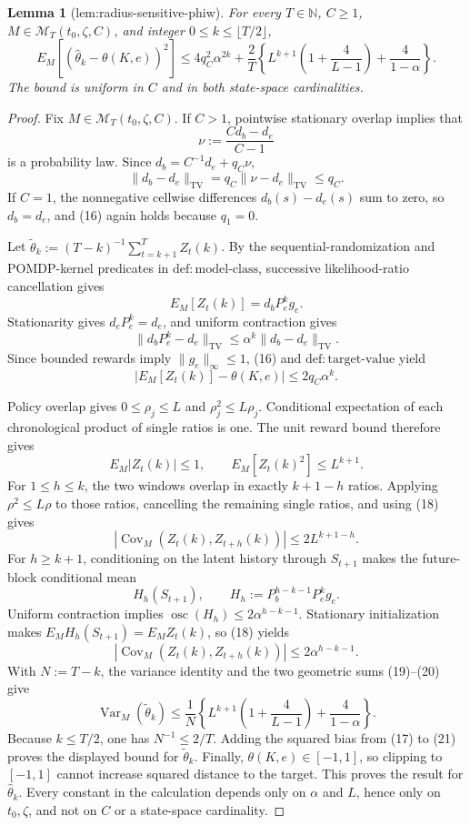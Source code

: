 \documentclass{article}
\newtheorem{lemma}{Lemma}
\begin{document}
\begin{lemma}[lem:radius-sensitive-phiw]\label{lem:radius-sensitive-phiw}
For every \(T\in\mathbb N\), \(C\ge1\), \(M\in\mathcal M_T(t_0,\zeta,C)\), and integer \(0\le k\le\lfloor T/2\rfloor\),
\[
 E_M[(\widehat\theta_k-\theta(K,e))^2]
 \le4q_C^2\alpha^{2k}
 +\frac2T\left\{L^{k+1}\left(1+\frac4{L-1}\right)
 +\frac4{1-\alpha}\right\}.
\]
The bound is uniform in \(C\) and in both state-space cardinalities.
\end{lemma}
\begin{proof}
Fix \(M\in\mathcal M_T(t_0,\zeta,C)\).  If \(C>1\), pointwise stationary overlap implies that
\[
 \nu:=\frac{Cd_b-d_e}{C-1}
\]
is a probability law.  Since \(d_b=C^{-1}d_e+q_C\nu\),
\[
 \lVert d_b-d_e\rVert_{\mathrm{TV}}
 =q_C\lVert\nu-d_e\rVert_{\mathrm{TV}}
 \le q_C. \tag{16}
\]
If \(C=1\), the nonnegative cellwise differences \(d_b(s)-d_e(s)\) sum to zero, so \(d_b=d_e\), and (16) again holds because \(q_1=0\).

Let \(\widetilde\theta_k:=(T-k)^{-1}\sum_{t=k+1}^TZ_t(k)\).  By the sequential-randomization and POMDP-kernel predicates in \(\mathrm{def{:}model\text{-}class}\), successive likelihood-ratio cancellation gives
\[
 E_M[Z_t(k)]=d_bP_e^kg_e.
\]
Stationarity gives \(d_eP_e^k=d_e\), and uniform contraction gives
\[
 \lVert d_bP_e^k-d_e\rVert_{\mathrm{TV}}
 \le\alpha^k\lVert d_b-d_e\rVert_{\mathrm{TV}}.
\]
Since bounded rewards imply \(\lVert g_e\rVert_\infty\le1\), (16) and \(\mathrm{def{:}target\text{-}value}\) yield
\[
 |E_M[Z_t(k)]-\theta(K,e)|\le2q_C\alpha^k. \tag{17}
\]

Policy overlap gives \(0\le\rho_j\le L\) and \(\rho_j^2\le L\rho_j\).  Conditional expectation of each chronological product of single ratios is one.  The unit reward bound therefore gives
\[
 E_M|Z_t(k)|\le1,
 \qquad E_M[Z_t(k)^2]\le L^{k+1}. \tag{18}
\]
For \(1\le h\le k\), the two windows overlap in exactly \(k+1-h\) ratios.  Applying \(\rho^2\le L\rho\) to those ratios, cancelling the remaining single ratios, and using (18) gives
\[
 |\operatorname{Cov}_M(Z_t(k),Z_{t+h}(k))|
 \le2L^{k+1-h}. \tag{19}
\]
For \(h\ge k+1\), conditioning on the latent history through \(S_{t+1}\) makes the future-block conditional mean
\[
 H_h(S_{t+1}),
 \qquad H_h:=P_b^{h-k-1}P_e^kg_e.
\]
Uniform contraction implies \(\operatorname{osc}(H_h)\le2\alpha^{h-k-1}\).  Stationary initialization makes \(E_MH_h(S_{t+1})=E_MZ_t(k)\), so (18) yields
\[
 |\operatorname{Cov}_M(Z_t(k),Z_{t+h}(k))|
 \le2\alpha^{h-k-1}. \tag{20}
\]
With \(N:=T-k\), the variance identity and the two geometric sums (19)--(20) give
\[
 \operatorname{Var}_M(\widetilde\theta_k)
 \le\frac1N\left\{L^{k+1}\left(1+\frac4{L-1}\right)
 +\frac4{1-\alpha}\right\}. \tag{21}
\]
Because \(k\le T/2\), one has \(N^{-1}\le2/T\).  Adding the squared bias from (17) to (21) proves the displayed bound for \(\widetilde\theta_k\).  Finally, \(\theta(K,e)\in[-1,1]\), so clipping to \([-1,1]\) cannot increase squared distance to the target.  This proves the result for \(\widehat\theta_k\).  Every constant in the calculation depends only on \(\alpha\) and \(L\), hence only on \(t_0,\zeta\), and not on \(C\) or a state-space cardinality.
\end{proof}
\end{document}
